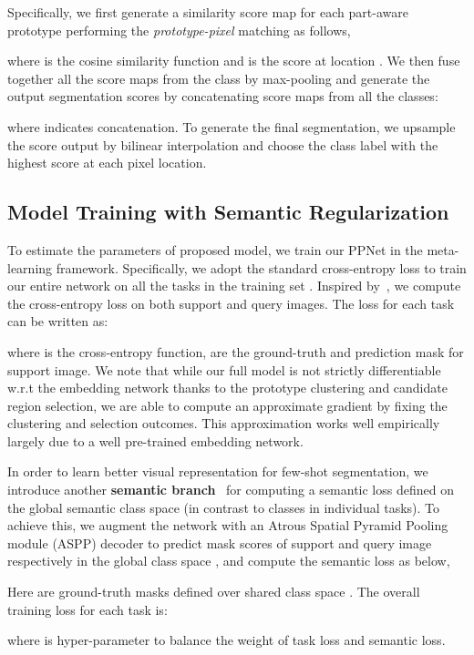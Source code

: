 \documentclass[runningheads]{llncs}
\begin{document}
Specifically, we first generate a similarity score map for each part-aware prototype performing the \textit{prototype-pixel} matching as follows, 

where  is the {cosine similarity} function and  is the score at location . We then fuse together all the score maps from the class  by max-pooling and generate the output segmentation scores by concatenating score maps from all the classes: 

where  indicates concatenation. To generate the final segmentation, we upsample the score output  by bilinear interpolation and choose the class label with the highest score at each pixel location. 



\subsection{Model Training with Semantic Regularization}\label{sec:traning}
To estimate the parameters of proposed model, we train our PPNet in the meta-learning framework. Specifically, we adopt the standard cross-entropy loss to train our entire network on all the tasks in the training set . Inspired by~\cite{wang2019panet}, we compute the cross-entropy loss on both support and query images. The loss for each task can be written as:


where  is the cross-entropy function,  are the ground-truth and prediction mask for support image. We note that while our full model is not strictly differentiable w.r.t the embedding network thanks to the prototype clustering and candidate region selection, we are able to compute an approximate gradient by fixing the clustering and selection outcomes. This approximation works well empirically largely due to a well pre-trained embedding network.

In order to learn better visual representation for few-shot segmentation, we introduce another \textbf{semantic branch}~\cite{yan2019dual} for computing a semantic loss defined on the global semantic class space  (in contrast to  classes in individual tasks). To achieve this, we augment the network with an Atrous Spatial Pyramid Pooling module (ASPP) decoder to predict mask scores  of support and query image respectively in the global class space , and compute the semantic loss as below, 

Here  are ground-truth masks defined over shared class space . The overall training loss for each task is:

where  is hyper-parameter to balance the weight of task loss and semantic loss.
\end{document}
